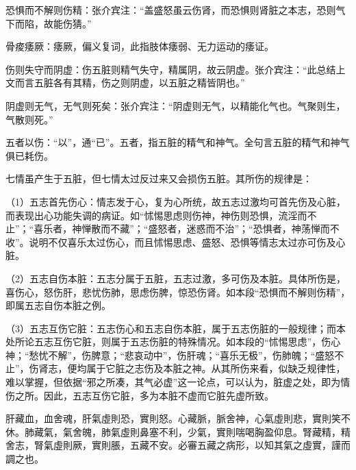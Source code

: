 \documentclass[12pt]{ctexbook}
\begin{document}
\begin{jiaozhu}
	\item 恐惧而不解则伤精：张介宾注：“盖盛怒虽云伤肾，而恐惧则肾脏之本志，恐则气下而陷，故能伤猜。”
	\item 骨痠痿厥：痿厥，偏义复词，此指肢体痿弱、无力运动的痿证。
	\item 伤则失守而阴虚：伤五脏则精气失守，精属阴，故云阴虚。张介宾注：“此总结上文而言五脏各有其精，伤之则阴虚，以五脏之精皆阴也。”
	\item 阴虚则无气，无气则死矣：张介宾注：“阴虚则无气，以精能化气也。气聚则生，气散则死。”
	\item 五者以伤：“以”，通“已”。五者，指五脏的精气和神气。全句言五脏的精气和神气俱已耗伤。
\end{jiaozhu}



七情虽产生于五脏，但七情太过反过来又会损伤五脏。其所伤的规律是：

（1）五志首先伤心：情志发于心，复为心所统，故五志过激均可首先伤及心脏，而表现出心功能失调的病证。如“怵惕思虑则伤神，神伤则恐惧，流淫而不止”；“喜乐者，神惮散而不藏”；“盛怒者，迷惑而不治”；“恐惧者，神荡惮而不收”。说明不仅喜乐太过伤心，而且怵惕思虑、盛怒、恐惧等情志太过亦可伤及心脏。

（2）五志自伤本脏：五志分属于五脏，五志过激，多可伤及本脏。具体所伤是，喜伤心，怒伤肝，悲忧伤肺，思虑伤脾，惊恐伤肾。如本段“恐惧而不解则伤精”，即属五志自伤本脏之例。

（3）五志互伤它脏：五志伤心和五志自伤本脏，属于五志伤脏的一般规律；而本处所论五志互伤它脏，则属于五志伤脏的特殊情况。如本段的“怵惕思虑”，伤心神；“愁忧不解”，伤脾意；“悲哀动中”，伤肝魂；“喜乐无极”，伤肺魄；“盛怒不止”，伤肾志，便均属于它脏之志伤及本脏之神。从其所伤来看，似缺乏规律性，难以掌握，但依据“邪之所凑，其气必虚”这一论点，可以认为，脏虚之处，即为情伤之所。因此，五志互伤它脏，多为本脏不虚而它脏先虚所致。


\begin{yuanwen}
肝藏血，血舍魂，肝氣虛則恐，實則怒。心藏脈，脈舍神，心氣虛則悲，實則笑不休。肺藏氣，氣舍魄，肺氣虛則鼻塞不利，少氣，實則喘喝胸盈仰息。腎藏精，精舍志，腎氣虛則厥，實則脹，五藏不安。必審五藏之病形，以知其氣之虛實，謹而調之也。
\end{yuanwen}

\end{document}
